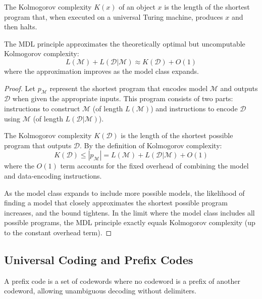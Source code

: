\begin{definition}
The Kolmogorov complexity $K(x)$ of an object $x$ is the length of the shortest program that, when executed on a universal Turing machine, produces $x$ and then halts.
\end{definition}

\begin{theorem}
The MDL principle approximates the theoretically optimal but uncomputable Kolmogorov complexity:
\begin{equation}
L(\mathcal{M}) + L(\mathcal{D} | \mathcal{M}) \approx K(\mathcal{D}) + O(1)
\end{equation}
where the approximation improves as the model class expands.
\end{theorem}

\begin{proof}
Let $p_{\mathcal{M}}$ represent the shortest program that encodes model $\mathcal{M}$ and outputs $\mathcal{D}$ when given the appropriate inputs. This program consists of two parts: instructions to construct $\mathcal{M}$ (of length $L(\mathcal{M})$) and instructions to encode $\mathcal{D}$ using $\mathcal{M}$ (of length $L(\mathcal{D} | \mathcal{M})$).

The Kolmogorov complexity $K(\mathcal{D})$ is the length of the shortest possible program that outputs $\mathcal{D}$. By the definition of Kolmogorov complexity:
\begin{equation}
K(\mathcal{D}) \leq |p_{\mathcal{M}}| = L(\mathcal{M}) + L(\mathcal{D} | \mathcal{M}) + O(1)
\end{equation}
where the $O(1)$ term accounts for the fixed overhead of combining the model and data-encoding instructions.

As the model class expands to include more possible models, the likelihood of finding a model that closely approximates the shortest possible program increases, and the bound tightens. In the limit where the model class includes all possible programs, the MDL principle exactly equals Kolmogorov complexity (up to the constant overhead term).
\end{proof}

\subsection{Universal Coding and Prefix Codes}

\begin{definition}
A prefix code is a set of codewords where no codeword is a prefix of another codeword, allowing unambiguous decoding without delimiters.
\end{definition}


